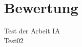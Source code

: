 \documentclass{thesisclass}
\begin{document}
\section{Bewertung}

\mainmatter
{}

Test der Arbeit \gls{IA} \cite{gassist} \\
Test02 \cite{inspirobot}

\cleardoublepage
{}
{}

{}	%
{}	%




%


\cleardoublepage
\printglossary
\end{document}
